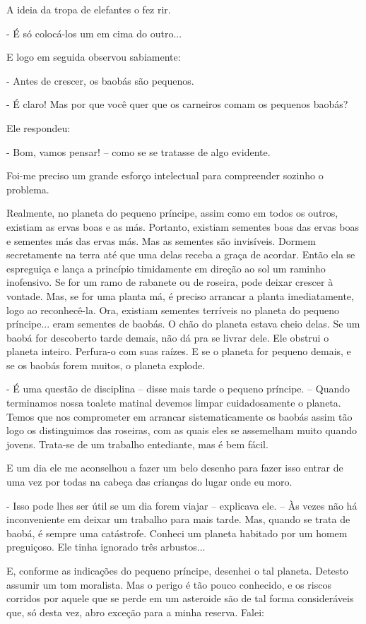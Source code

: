 \begin{Parallel}[p]{}{}
{A ideia da tropa de elefantes o fez rir.

- É só colocá-los um em cima do outro...

E logo em seguida observou sabiamente:

- Antes de crescer, os baobás são pequenos.

- É claro! Mas por que você quer que os carneiros comam os pequenos
baobás?

Ele respondeu:

- Bom, vamos pensar! -- como se se tratasse de algo evidente.

Foi-me preciso um grande esforço intelectual para compreender sozinho o
problema.

Realmente, no planeta do pequeno príncipe, assim como em todos os
outros, existiam as ervas boas e as más. Portanto, existiam sementes
boas das ervas boas e sementes más das ervas más. Mas as sementes são
invisíveis. Dormem secretamente na terra até que uma delas receba a
graça de acordar. Então ela se espreguiça e lança a princípio
timidamente em direção ao sol um raminho inofensivo. Se for um ramo de
rabanete ou de roseira, pode deixar crescer à vontade. Mas, se for uma
planta má, é preciso arrancar a planta imediatamente, logo ao
reconhecê-la. Ora, existiam sementes terríveis no planeta do pequeno
príncipe... eram sementes de baobás. O chão do planeta estava cheio
delas. Se um baobá for descoberto tarde demais, não dá pra se livrar
dele. Ele obstrui o planeta inteiro. Perfura-o com suas raízes. E se o
planeta for pequeno demais, e se os baobás forem muitos, o planeta
explode.

- É uma questão de disciplina -- disse mais tarde o pequeno príncipe. --
Quando terminamos nossa toalete matinal devemos limpar cuidadosamente o
planeta. Temos que nos comprometer em arrancar sistematicamente os
baobás assim tão logo os distinguimos das roseiras, com as quais eles se
assemelham muito quando jovens. Trata-se de um trabalho entediante, mas
é bem fácil.

E um dia ele me aconselhou a fazer um belo desenho para fazer isso
entrar de uma vez por todas na cabeça das crianças do lugar onde eu
moro.

- Isso pode lhes ser útil se um dia forem viajar -- explicava ele. -- Às
vezes não há inconveniente em deixar um trabalho para mais tarde. Mas,
quando se trata de baobá, é sempre uma catástrofe. Conheci um planeta
habitado por um homem preguiçoso. Ele tinha ignorado três arbustos...

E, conforme as indicações do pequeno príncipe, desenhei o tal planeta.
Detesto assumir um tom moralista. Mas o perigo é tão pouco conhecido, e
os riscos corridos por aquele que se perde em um asteroide são de tal
forma consideráveis que, só desta vez, abro exceção para a minha
reserva. Falei:

}
\end{Parallel}
